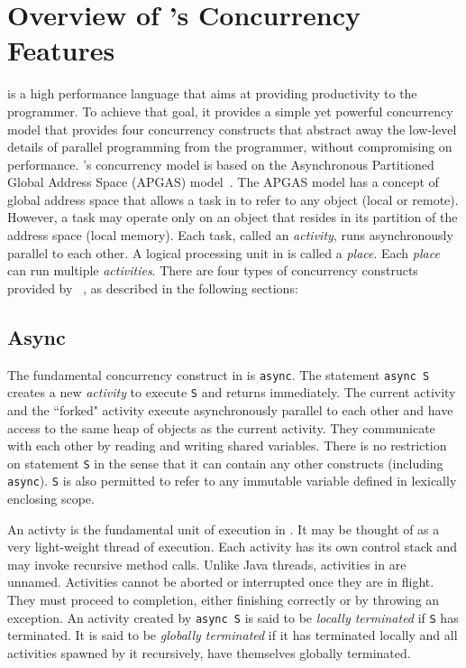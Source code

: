 \section{Overview of \xten's Concurrency Features}\label{sec:XX}

\xten is a high performance language that aims at providing productivity to the
programmer. To achieve that goal, it provides a simple yet powerful concurrency
model that provides four concurrency constructs that abstract away the low-level
details of parallel programming from the programmer, without compromising on
performance. \xten's concurrency model is based on the Asynchronous Partitioned
Global Address Space (APGAS) model~\cite{apgaspaper}. The APGAS model has a concept
of global address space that allows a task in \xten to refer to any object
(local or remote). However, a task may operate only on an object that resides in
its partition of the address space (local memory). Each task, called an
\emph{activity}, runs asynchronously parallel to each other. A logical
processing unit in \xten is called a \emph{place}. Each \emph{place} can run
multiple \emph{activities}.    
There are four types of concurrency constructs provided by
\xten~\cite{x10intro}, as described in the following sections:

\subsection{Async} The fundamental concurrency construct in \xten is
\texttt{async}. The statement \texttt{async S} creates a new \emph{activity} to
execute \texttt{S} and returns immediately. The current activity and the
``forked" activity execute asynchronously parallel to each other and have access
to the same heap of objects as the current activity. They communicate with each
other by reading and writing shared variables. There is no restriction on
statement \texttt{S} in the sense that it can contain any other constructs (including
\texttt{async}). \texttt{S} is also permitted to refer to any immutable variable
defined in lexically enclosing scope.

An activty is
the fundamental unit of execution in \xten. It may be thought of as a very
light-weight thread of execution. Each activity has its own control stack and
may invoke recursive method calls. Unlike Java threads, activities in \xten are
unnamed. Activities cannot be aborted or interrupted once they are in flight.
They must proceed to completion, either finishing correctly or by throwing an
exception. An activity created by \texttt{async S} is said to be \emph{locally
terminated} if \texttt{S} has terminated. It is said to be \emph{globally
terminated} if it has terminated locally and all activities spawned by it
recursively, have themselves globally terminated.
   
